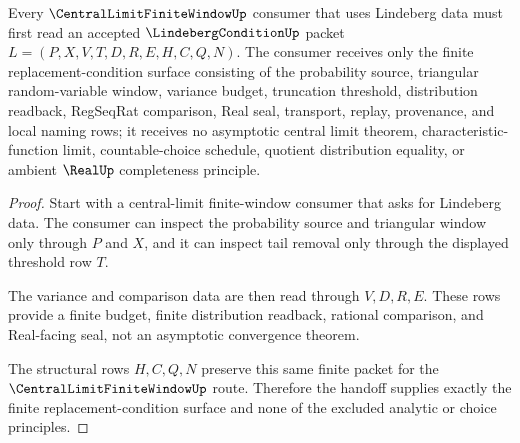 \begin{theorem}
\label{thm:lindeberg-condition-central-limit-handoff}
Every $\CentralLimitFiniteWindowUp$ consumer that uses Lindeberg data must first read an accepted $\LindebergConditionUp$ packet $L=(P,X,V,T,D,R,E,H,C,Q,N)$. The consumer receives only the finite replacement-condition surface consisting of the probability source, triangular random-variable window, variance budget, truncation threshold, distribution readback, RegSeqRat comparison, Real seal, transport, replay, provenance, and local naming rows; it receives no asymptotic central limit theorem, characteristic-function limit, countable-choice schedule, quotient distribution equality, or ambient $\RealUp$ completeness principle.
\end{theorem}
\begin{proof}
Start with a central-limit finite-window consumer that asks for Lindeberg data. The consumer can inspect the probability source and triangular window only through $P$ and $X$, and it can inspect tail removal only through the displayed threshold row $T$.

The variance and comparison data are then read through $V,D,R,E$. These rows provide a finite budget, finite distribution readback, rational comparison, and Real-facing seal, not an asymptotic convergence theorem.

The structural rows $H,C,Q,N$ preserve this same finite packet for the $\CentralLimitFiniteWindowUp$ route. Therefore the handoff supplies exactly the finite replacement-condition surface and none of the excluded analytic or choice principles.
\end{proof}


\begin{closurestatus}{\LindebergConditionUp}
  \theoryclosure{\seedClosure}
  \formalstatus{\unformalizedV}
\end{closurestatus}
